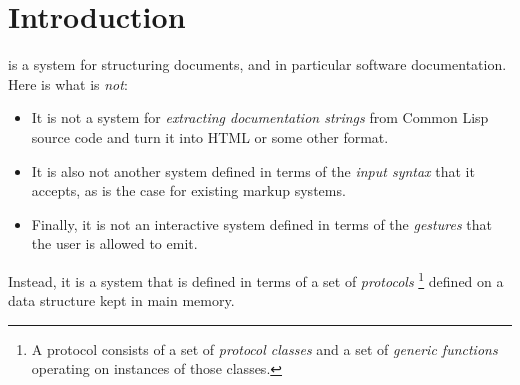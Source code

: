 \chapter{Introduction}
\setcounter{page}{1}%
%
\label{chap-introduction}%

\sysname{} is a system for structuring documents, and in particular
software documentation.  Here is what \sysname{} is \emph{not}:

\begin{itemize}
\item It is not a system for \emph{extracting documentation strings}
  from Common Lisp source code and turn it into HTML or some other
  format.
\item It is also not another system defined in terms of the
  \emph{input syntax} that it accepts, as is the case for existing
  markup systems.
\item Finally, it is not an interactive system defined in terms of the
  \emph{gestures} that the user is allowed to emit.
\end{itemize}

Instead, it is a system that is defined in terms of a set of \clos{}
\emph{protocols}%
\footnote{A \clos{} protocol consists of a set of \emph{protocol
    classes} and a set of \emph{generic functions} operating on
  instances of those classes.}
defined on a data structure kept in main memory.
